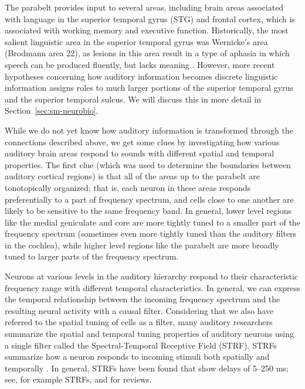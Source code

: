 The parabelt provides input
to several areas,
including brain areas
associated with language
in the superior temporal gyrus (STG)
and frontal cortex,
which is associated
with working memory and executive function.
Historically, the most
salient linguistic area
in the superior temporal gyrus
was Wernicke's area (Brodmann area 22),
as lesions in this area result in
a type of aphasia in which
speech can be produced fluently,
but lacks meaning
\cite{ellis1983}.
However, more recent hypotheses
concerning how auditory information
becomes discrete linguistic information
assigns roles to much larger portions
of the superior temporal gyrus
and the superior temporal sulcus.
We will discuss this in more detail
in Section~\ref{sec:sm-neurobio}.

While we do not yet know how auditory information
is transformed through the connections
described above,
we get some clues by investigating
how various auditory brain areas
respond to sounds with different
spatial and temporal properties.
The first clue
(which was used to determine the boundaries
between auditory cortical regions)
is that all of the areas
up to the parabelt are
tonotopically organized;
that is, each neuron in these areas
responds preferentially to
a part of frequency spectrum,
and cells close to one another
are likely to be sensitive
to the same frequency band.
In general, lower level regions
like the medial geniculate and core
are more tightly tuned
to a smaller part of the frequency spectrum
(sometimes even more tightly tuned
than the auditory filters in the cochlea),
while higher level regions
like the parabelt
are more broadly tuned
to larger parts of the frequency spectrum.

Neurons at various levels in the auditory hierarchy
respond to their characteristic frequency range
with different temporal characteristics.
In general, we can express the temporal
relationship between the incoming
frequency spectrum and the resulting
neural activity with a causal filter.
Considering that we also
have referred to the spatial tuning
of cells as a filter,
many auditory researchers
summarize the spatial and temporal
tuning properties of auditory neurons
using a single filter
called the
Spectral-Temporal Receptive Field (STRF).
STRFs summarize how a neuron responds
to incoming stimuli both spatially
and temporally \citep{aertsen1981}.
In general, STRFs have been found that
show delays of 5--250 ms;
see, \citet[Supplementary material]{mesgarani2014}
for example STRFs,
and \citet{kaas1999,kaas2000,scott2003,semple2003}
for reviews.

